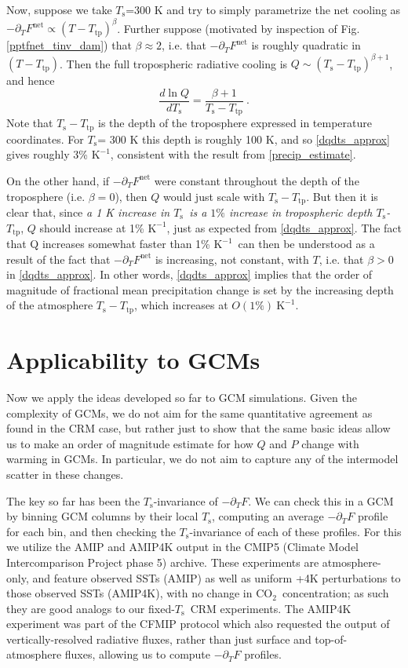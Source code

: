 \documentclass[9pt,twocolumn,twoside,lineno]{pnas-new}
\newcommand{\beqn}{\begin{equation}}
\newcommand{\eeqn}{\end{equation}}
\newcommand{\ppt}{\ensuremath{\partial_T}}
\newcommand{\cotwo}{\ensuremath{\mathrm{CO_2}}}
\newcommand{\Fnet}{\ensuremath{F^\mathrm{net}}}
\newcommand{\Kinverse}{\ensuremath{\mathrm{K^{-1}}}}
\newcommand{\Ts}{\ensuremath{T_\mathrm{s}}}
\newcommand{\Ttp}{\ensuremath{T_\mathrm{tp}}}
\begin{document}
Now, suppose we take \Ts=300 K and  try to simply parametrize the net cooling as $-\ppt \Fnet \propto (T-\Ttp)^\beta$.  Further suppose (motivated by inspection of Fig. \ref{pptfnet_tinv_dam})  that $\beta \approx 2$, i.e. that $-\ppt \Fnet$ is roughly quadratic  in $(T-\Ttp)$. Then the full tropospheric radiative cooling is $Q\sim (\Ts-\Ttp)^{\beta+1}$, and hence 
	\beqn
		\frac{d \ln Q}{d \Ts}  =  \frac{\beta+1}{\Ts-\Ttp}\ . \label{dqdts_approx}
	\eeqn
Note that $\Ts-\Ttp$ is the depth of the troposphere expressed in temperature coordinates. For  \Ts= 300 K this depth is roughly 100 K, and so \eqref{dqdts_approx} gives roughly 3\% \Kinverse, consistent with the result from \eqref{precip_estimate}.

On the other hand, if $-\ppt \Fnet$ were constant throughout the depth of the troposphere (i.e. $\beta=0$), then $Q$ would just scale with $\Ts-\Ttp$. But then it is clear that, since \emph{a 1 K increase in \Ts\  is a $1\%$ increase in tropospheric depth \Ts-\Ttp}, $Q$ should increase at 1\% \Kinverse, just as expected from \eqref{dqdts_approx}. The fact that Q increases somewhat faster than 1\% \Kinverse\  can then be understood as a result of the fact that $-\ppt \Fnet$ is increasing, not constant, with $T$, i.e. that $\beta>0$ in \eqref{dqdts_approx}. In other words, \eqref{dqdts_approx} implies that the order of magnitude of fractional  mean precipitation change is set by the increasing depth of the atmosphere $\Ts-\Ttp$, which increases at $O(1\%)\ \Kinverse$.



\section{Applicability to GCMs} \label{sec_GCMs}
Now we apply the ideas developed so far to GCM simulations. Given the complexity of GCMs, we do not aim for the same quantitative agreement as found in the CRM case, but rather just to show that the same basic ideas allow us to make an order of magnitude estimate for how $Q$ and $P$ change with warming in GCMs. In particular, we do not aim to capture any of the intermodel scatter in these changes.

The key so far has been  the \Ts-invariance of $-\ppt F$. We can check this in a GCM by binning  GCM columns by their local \Ts, computing an average $-\ppt F$ profile for each bin, and then checking the \Ts-invariance of each of these profiles. For this we utilize the AMIP and AMIP4K  output in the CMIP5 (Climate Model Intercomparison Project phase 5) archive. These experiments are atmosphere-only, and feature observed SSTs (AMIP) as well as uniform +4K perturbations to those observed SSTs (AMIP4K), with no change in \cotwo\ concentration; as such they are good analogs to our fixed-\Ts\ CRM experiments. The AMIP4K experiment was part of the CFMIP protocol \cite[Cloud Feedback Model Intercomparison Project,][]{bony2011} which also requested the output of vertically-resolved radiative fluxes, rather than just surface and top-of-atmosphere fluxes, allowing us to compute $-\ppt F$ profiles.
\end{document}
